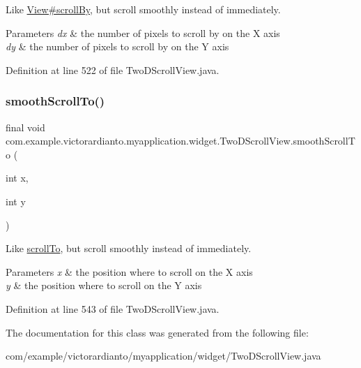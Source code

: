 Like \mbox{\hyperlink{}{View\#scroll\+By}}, but scroll smoothly instead of immediately.


\begin{DoxyParams}{Parameters}
{\em dx} & the number of pixels to scroll by on the X axis \\
\hline
{\em dy} & the number of pixels to scroll by on the Y axis \\
\hline
\end{DoxyParams}


Definition at line 522 of file Two\+D\+Scroll\+View.\+java.

\mbox{\label{classcom_1_1example_1_1victorardianto_1_1myapplication_1_1widget_1_1_two_d_scroll_view_abdab45c3d2e7d2101ba37346cfac3efc}} 
\subsubsection{\texorpdfstring{smooth\+Scroll\+To()}{smoothScrollTo()}}
{\footnotesize\ttfamily final void com.\+example.\+victorardianto.\+myapplication.\+widget.\+Two\+D\+Scroll\+View.\+smooth\+Scroll\+To (\begin{DoxyParamCaption}\item[{int}]{x,  }\item[{int}]{y }\end{DoxyParamCaption})\hspace{0.3cm}{\ttfamily [inline]}}

Like \mbox{\hyperlink{classcom_1_1example_1_1victorardianto_1_1myapplication_1_1widget_1_1_two_d_scroll_view_a2178f482b96f9c80010ec5ae0f9822a7}{scroll\+To}}, but scroll smoothly instead of immediately.


\begin{DoxyParams}{Parameters}
{\em x} & the position where to scroll on the X axis \\
\hline
{\em y} & the position where to scroll on the Y axis \\
\hline
\end{DoxyParams}


Definition at line 543 of file Two\+D\+Scroll\+View.\+java.



The documentation for this class was generated from the following file\+:\begin{DoxyCompactItemize}
\item 
com/example/victorardianto/myapplication/widget/Two\+D\+Scroll\+View.\+java\end{DoxyCompactItemize}
